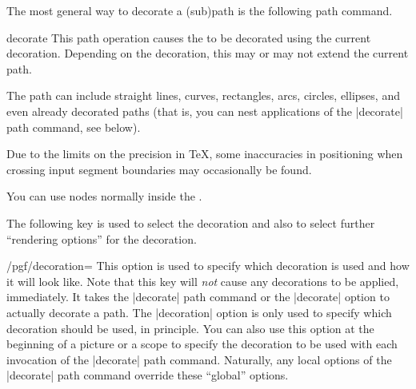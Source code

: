 The most general way to decorate a (sub)path is the following path command.

\begin{pathoperation}{decorate}{}
    This path operation causes the  to be decorated using the
    current decoration. Depending on the decoration, this may or may not extend
    the current path.
\begin{codeexample}[]
\end{codeexample}
    The path can include straight lines, curves, rectangles, arcs, circles,
    ellipses, and even already decorated paths (that is, you can nest
    applications of the |decorate| path command, see below).

    Due to the limits on the precision in  \TeX, some inaccuracies in
    positioning when crossing input segment boundaries may occasionally be
    found.

    You can use nodes normally inside the .
\begin{codeexample}[]
\end{codeexample}

    The following key is used to select the decoration and also to select
    further ``rendering options'' for the decoration.

    \begin{key}{/pgf/decoration=}
        This option is used to specify which decoration is used and how it will
        look like. Note that this key will \emph{not} cause any decorations to
        be applied, immediately. It takes the |decorate| path command or the
        |decorate| option to actually decorate a path. The |decoration| option
        is only used to specify which decoration should be used, in principle.
        You can also use this option at the beginning of a picture or a scope
        to specify the decoration to be used with each invocation of the
        |decorate| path command. Naturally, any local options of the |decorate|
        path command override these ``global'' options.
\begin{codeexample}[]
\end{codeexample}


\end{key}
\end{pathoperation}
